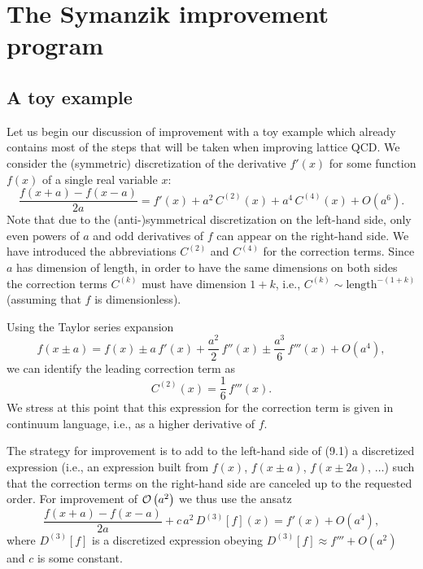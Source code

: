 \section{The Symanzik improvement program}
\label{sec:9.1}

\subsection{A toy example}
\label{sec:9.1.1}

Let us begin our discussion of improvement with a toy example which already
contains most of the steps that will be taken when improving lattice QCD. We
consider the (symmetric) discretization of the derivative $f'(x)$ for some
function $f(x)$ of a single real variable $x$:
\begin{equation}
  \frac{f(x+a) - f(x-a)}{2a}
  = f'(x) + a^2\,C^{(2)}(x) + a^4\,C^{(4)}(x) + O(a^6) .
\end{equation}
Note that due to the (anti-)symmetrical discretization on the left-hand side,
only even powers of $a$ and odd derivatives of $f$ can appear on the
right-hand side. We have introduced the abbreviations $C^{(2)}$ and $C^{(4)}$
for the correction terms. Since $a$ has dimension of length, in order to have
the same dimensions on both sides the correction terms $C^{(k)}$ must have
dimension $1+k$, i.e., $C^{(k)} \sim \mathrm{length}^{-(1+k)}$ (assuming that
$f$ is dimensionless).

Using the Taylor series expansion
\begin{equation}
  f(x \pm a) = f(x) \pm a\,f'(x) + \frac{a^2}{2}\,f''(x)
    \pm \frac{a^3}{6}\,f'''(x) + O(a^4) ,
\end{equation}
we can identify the leading correction term as
\begin{equation}
  C^{(2)}(x) = \frac{1}{6}\,f'''(x) .
\end{equation}
We stress at this point that this expression for the correction term is given
in continuum language, i.e., as a higher derivative of $f$.

The strategy for improvement is to add to the left-hand side of (9.1) a
discretized expression (i.e., an expression built from $f(x)$, $f(x\pm a)$,
$f(x\pm 2a)$, $\ldots$) such that the correction terms on the right-hand side
are canceled up to the requested order. For improvement of $\mathcal{O}\left(a^2\right)$ we
thus use the ansatz
\begin{equation}
  \frac{f(x+a) - f(x-a)}{2a} + c\,a^2\,D^{(3)}[f](x) = f'(x) + O(a^4) ,
\end{equation}
where $D^{(3)}[f]$ is a discretized expression obeying $D^{(3)}[f] \approx
f''' + O(a^2)$ and $c$ is some constant.


